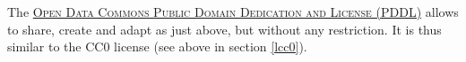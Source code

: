 \vspace{0.4cm}

\noindent {} The \textsc{\href{http://opendatacommons.org/licenses/pddl/summary/}{Open Data Commons Public Domain Dedication and License (PDDL)}} allows to share, create and adapt as just above, but without any restriction. It is thus similar to the CC0 license (see above in section \ref{lcc0}).





